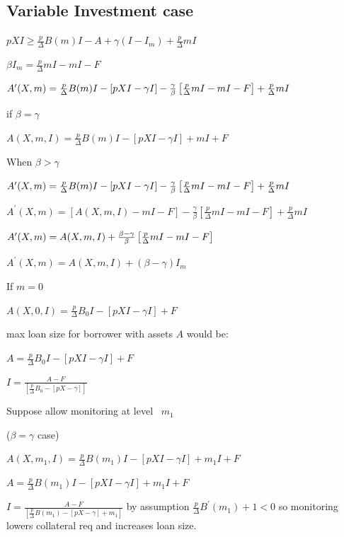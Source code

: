 \documentclass{article}
\begin{document}
\subsection{Variable Investment case}

$pXI\geq \frac{p}{\Delta }B(m)I-A+\gamma (I-I_{m})+\frac{p}{\Delta }mI$

$\beta I_{m}=\frac{p}{\Delta }mI-mI-F$

$A^{\prime }(X,m)=\frac{p}{\Delta }B(m)I-\left[ pXI-\gamma I\right] -\frac{%
\gamma }{\beta }\left[ \frac{p}{\Delta }mI-mI-F\right] +\frac{p}{\Delta }mI$

if $\beta =\gamma $

$A(X,m,I)=\frac{p}{\Delta }B(m)I-\left[ pXI-\gamma I\right] +mI+F$

When $\beta >\gamma $

$A^{\prime }(X,m)=\frac{p}{\Delta }B(m)I-\left[ pXI-\gamma I\right] -\frac{%
\gamma }{\beta }\left[ \frac{p}{\Delta }mI-mI-F\right] +\frac{p}{\Delta }mI$

$A^{\prime }(X,m)=\left[ A(X,m,I)-mI-F\right] -\frac{\gamma }{\beta }\left[ 
\frac{p}{\Delta }mI-mI-F\right] +\frac{p}{\Delta }mI$

$A^{\prime }(X,m)=A(X,m,I)+\frac{\beta -\gamma }{\beta }\left[ \frac{p}{%
\Delta }mI-mI-F\right] $

$A^{\prime }(X,m)=A(X,m,I)+(\beta -\gamma )I_{m}$

If $m=0$

$A(X,0,I)=\frac{p}{\Delta }B_{0}I-\left[ pXI-\gamma I\right] +F$

max loan size for borrower with assets $A$ would be:

$A=\frac{p}{\Delta }B_{0}I-\left[ pXI-\gamma I\right] +F$

$I=\frac{A-F}{\left[ \frac{p}{\Delta }B_{0}-\left[ pX-\gamma \right] \right] 
}$

Suppose allow monitoring at level \ $m_{1}$

($\beta =\gamma $ case)

$A(X,m_{1},I)=\frac{p}{\Delta }B(m_{1})I-\left[ pXI-\gamma I\right] +m_{1}I+F
$

$A=\frac{p}{\Delta }B(m_{1})I-\left[ pXI-\gamma I\right] +m_{1}I+F$

$I=\frac{A-F}{\left[ \frac{p}{\Delta }B(m_{1})-\left[ pX-\gamma \right]
+m_{1}\right] }$\newline
\newline
by assumption $\frac{p}{\Delta }B^{\prime }(m_{1})+1<0$ so monitoring lowers
collateral req and increases loan size.
\end{document}
